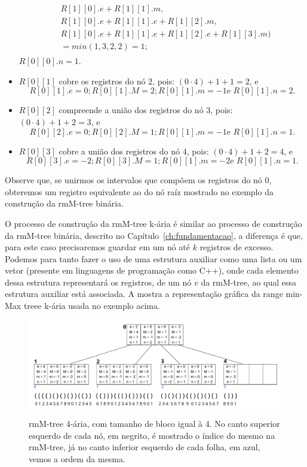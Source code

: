 \begin{example}
\begin{itemize}
\begin{eqnarray*}
\begin{split}
                        &   R[1][0].e + R[1][1].m, \\
                        &   R[1][0].e + R[1][1].e + R[1][2].m,  \\
                        &   R[1][0].e + R[1][1].e + R[1][2].e + R[1][3].m)\\
                        &   = min(1,3,2,2) = 1;
                    \end{split}
                \end{eqnarray*}
                $R[0][0].n = 1$.
            \item $R[0][1]$ cobre os registros do nó $2$, pois: $(0 \cdot 4) +1 + 1=2$, e
            $$R[0][1].e = 0; R[0][1].M = 2; R[0][1].m=-1 \mbox{e } R[0][1].n=2.$$
            \item $R[0][2]$ compreende a união dos registros do nó $3$, pois: $(0 \cdot 4) +1 + 2=3$, e
            $$R[0][2].e = 0; R[0][2].M = 1; R[0][1].m=-1 \mbox{e } R[0][1].n=1.$$
            \item $R[0][3]$ cobre a união dos registros do nó $4$, pois: $(0 \cdot 4) +1 + 2=4$, e
            $$R[0][3].e = -2; R[0][3].M = 1; R[0][1].m=-2 \mbox{e } R[0][1].n=1.$$
        \end{itemize} 

        Observe que, se unirmos os intervalos que compõem os registros do nó $0$, obteremos um registro equivalente ao do nó raíz mostrado no exemplo da construção da rmM-tree binária.
\end{example}

O processo de construção da rmM-tree k-ária é similar ao processo de construção da rmM-tree binária, descrito no Capítulo~\ref{ch:fundamentacao}, a diferença é que, para este caso precisaremos guardar em um nó até $k$ registros de excesso. Podemos para tanto fazer o uso de uma estrutura auxiliar como uma lista ou um vetor (presente em linguagens de programação como C++), onde cada elemento dessa estrutura representará os registros, de um nó $v$ da rmM-tree, ao qual essa estrutura auxiliar está associada. A  mostra a representação gráfica da range min-Max treee k-ária usada no exemplo acima.


\begin{figure}[h!]
    \centering
      \caption[rmM-tree 4-ária.]{rmM-tree 4-ária, com tamanho de bloco igual à 4. No canto superior esquerdo de cada nó, em negrito,
        é mostrado o índice do mesmo na rmM-tree, já no canto inferior esquerdo de cada folha, em azul, vemos a ordem da mesma.}
      \includegraphics[width=\columnwidth]{images/rmm-tree-kary.png}
      \label{fig:rmm-tree-k}
    \end{figure}

